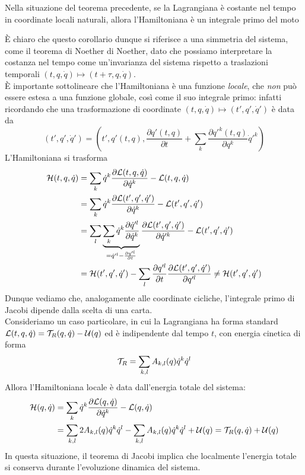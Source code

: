 \documentclass[openany]{book}
\begin{document}
\begin{corollary}{}{}
    Nella situazione del teorema precedente, se la Lagrangiana è costante nel tempo in coordinate locali naturali, allora l'Hamiltoniana è un integrale primo del moto
\end{corollary}

È chiaro che questo corollario dunque si riferisce a una simmetria del sistema, come il teorema di Noether di Noether, dato che possiamo interpretare la costanza nel tempo come un'invarianza del sistema rispetto a traslazioni temporali $(t,q,\dot q)\mapsto (t+\tau, q, \dot q)$.\\
È importante sottolineare che l'Hamiltoniana è una funzione \textit{locale}, che \textit{non} può essere estesa a una funzione globale, così come il suo integrale primo: infatti ricordando che una trasformazione di coordinate $(t,q,\dot q)\mapsto (t', q', \dot q')$ è data da 
\[ (t', q', \dot q') = \left( t', q'(t,q), \frac{\partial q'(t,q)}{\partial t} + \sum_k \frac{\partial q'^k(t,q)}{\partial q^k}\dot q'^k \right) \]
L'Hamiltoniana si trasforma 
\begin{align*}
    \mathcal{H}(t,q,\dot q) & = \sum_k \dot q^k\frac{\partial \mathcal{L}(t,q,\dot q)}{\partial \dot q^k} - \mathcal{L}(t,q,\dot q) \\
    & = \sum_k \dot q^k\frac{\partial \mathcal{L}(t',q',\dot q')}{\partial \dot q^k} - \mathcal{L}(t',q',\dot q')\\
    & = \sum_l \underbrace{\sum_k \dot q^k\frac{\partial \dot q'^l}{\partial \dot q^k} }_{= \dot q'^l - \frac{\partial q'^l}{\partial t}}\frac{\partial \mathcal{L}(t',q',\dot q')}{\partial \dot q'^k} - \mathcal{L}(t',q',\dot q') \\
    & = \mathcal{H}(t',q',\dot q') - \sum_l \frac{\partial q'^l}{\partial t}\frac{\partial \mathcal{L}(t',q',\dot q')}{\partial q'^l} \neq \mathcal{H}(t',q',\dot q')
\end{align*}
Dunque vediamo che, analogamente alle coordinate cicliche, l'integrale primo di Jacobi dipende dalla scelta di una carta.\\
Consideriamo un caso particolare, in cui la Lagrangiana ha forma standard $\mathcal{L}(t,q,\dot q) = \mathcal{T}_R(q,\dot q)-\mathcal{U}(q)$ ed è indipendente dal tempo $t$, con energia cinetica di forma 
\[ \mathcal{T}_R = \sum_{k,l} A_{k,l}(q)\dot q^k\dot q^l  \]
Allora l'Hamiltoniana locale è data dall'energia totale del sistema:
\begin{align*}
    \mathcal{H}(q,\dot q) & = \sum_k \dot q^k \frac{\partial \mathcal{L}(q,\dot q)}{\partial \dot q^k} - \mathcal{L}(q,\dot q)\\
    & = \sum_{k,l} 2 A_{k,l}(q)\dot q^k \dot q^l - \sum_{k,l} A_{k,l}(q)\dot q^k\dot q^l + \mathcal{U}(q) = \mathcal{T}_R(q,\dot q) + \mathcal{U}(q)
\end{align*}
In questa situazione, il teorema di Jacobi implica che localmente l'energia totale si conserva durante l'evoluzione dinamica del sistema.
\end{document}
